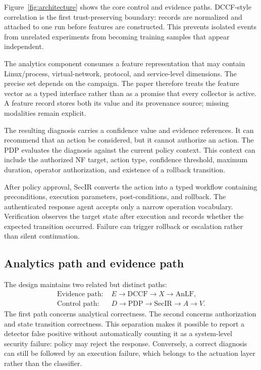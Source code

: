\documentclass[sigconf,review]{acmart}
\begin{document}
Figure~\ref{fig:architecture} shows the core control and evidence paths. DCCF-style correlation is the first trust-preserving boundary: records are normalized and attached to one run before features are constructed. This prevents isolated events from unrelated experiments from becoming training samples that appear independent.

The analytics component consumes a feature representation that may contain Linux/process, virtual-network, protocol, and service-level dimensions. The precise set depends on the campaign. The paper therefore treats the feature vector as a typed interface rather than as a promise that every collector is active. A feature record stores both its value and its provenance source; missing modalities remain explicit.

The resulting diagnosis carries a confidence value and evidence references. It can recommend that an action be considered, but it cannot authorize an action. The PDP evaluates the diagnosis against the current policy context. This context can include the authorized NF target, action type, confidence threshold, maximum duration, operator authorization, and existence of a rollback transition.

After policy approval, SecIR converts the action into a typed workflow containing preconditions, execution parameters, post-conditions, and rollback. The authenticated response agent accepts only a narrow operation vocabulary. Verification observes the target state after execution and records whether the expected transition occurred. Failure can trigger rollback or escalation rather than silent continuation.

\subsection{Analytics path and evidence path}
The design maintains two related but distinct paths:
\begin{align}
\text{Evidence path: } & E \rightarrow \text{DCCF} \rightarrow X \rightarrow \text{AnLF},\\
\text{Control path: } & D \rightarrow \text{PDP} \rightarrow \text{SecIR} \rightarrow A \rightarrow V.
\end{align}
The first path concerns analytical correctness. The second concerns authorization and state transition correctness. This separation makes it possible to report a detector false positive without automatically counting it as a system-level security failure: policy may reject the response. Conversely, a correct diagnosis can still be followed by an execution failure, which belongs to the actuation layer rather than the classifier.
\end{document}
